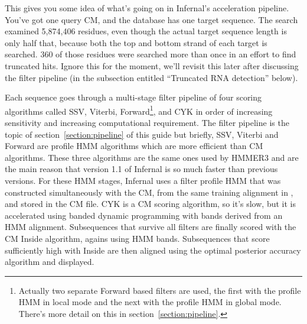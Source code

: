 This gives you some idea of what's going on in Infernal's acceleration
pipeline. You've got one query CM, and the database has one target
sequence. The search examined 5,874,406 residues, even though the
actual target sequence length is only half that, because both the top
and bottom strand of each target is searched. 360 of those residues
were searched more than once in an effort to find truncated
hits. Ignore this for the moment, we'll revisit this later after
discussing the filter pipeline (in the subsection entitled ``Truncated
RNA detection'' below).

Each sequence goes through a multi-stage filter pipeline of four
scoring algorithms called SSV, Viterbi, Forward\footnote{Actually two
  separate Forward based filters are used, the first with the profile
  HMM in local mode and the next with the profile HMM in global
  mode. There's more detail on this in
  section~\ref{section:pipeline}.}, and CYK in order of increasing
sensitivity and increasing computational requirement. The filter
pipeline is the topic of section~\ref{section:pipeline} of this guide
but briefly, SSV, Viterbi and Forward are profile HMM algorithms which
are more efficient than CM algorithms. These three algorithms are the
same ones used by HMMER3 and are the main reason that version 1.1 of
Infernal is so much faster than previous versions. For these HMM
stages, Infernal uses a filter profile HMM that was constructed
simultaneously with the CM, from the same training alignment in
, and stored in the CM file. CYK is a CM scoring
algorithm, so it's slow, but it is accelerated using banded dynamic
programming with bands derived from an HMM alignment. Subsequences
that survive all filters are finally scored with the CM Inside
algorithm, agains using HMM bands. Subsequences that score
sufficiently high with Inside are then aligned using the optimal
posterior accuracy algorithm and displayed.

